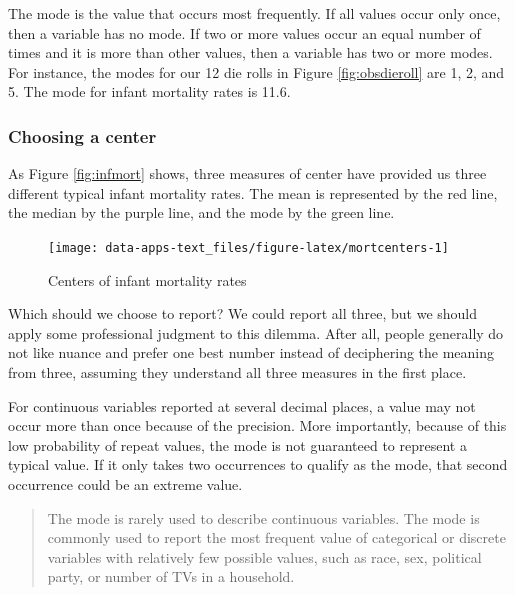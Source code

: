 \documentclass[
]{book}
\begin{document}
The mode is the value that occurs most frequently. If all values occur only once, then a variable has no mode. If two or more values occur an equal number of times and it is more than other values, then a variable has two or more modes. For instance, the modes for our 12 die rolls in Figure \ref{fig:obsdieroll} are 1, 2, and 5. The mode for infant mortality rates is 11.6.

\hypertarget{choosing-a-center}{%
\subsubsection*{Choosing a center}\label{choosing-a-center}}

As Figure \ref{fig:infmort} shows, three measures of center have provided us three different typical infant mortality rates. The mean is represented by the red line, the median by the purple line, and the mode by the green line.

\begin{figure}

{\centering \texttt{[image: data-apps-text\_files/figure-latex/mortcenters-1]} 

}

\caption{Centers of infant mortality rates}\label{fig:mortcenters}
\end{figure}

Which should we choose to report? We could report all three, but we should apply some professional judgment to this dilemma. After all, people generally do not like nuance and prefer one best number instead of deciphering the meaning from three, assuming they understand all three measures in the first place.

For continuous variables reported at several decimal places, a value may not occur more than once because of the precision. More importantly, because of this low probability of repeat values, the mode is not guaranteed to represent a typical value. If it only takes two occurrences to qualify as the mode, that second occurrence could be an extreme value.

\begin{quote}
The mode is rarely used to describe continuous variables. The mode is commonly used to report the most frequent value of categorical or discrete variables with relatively few possible values, such as race, sex, political party, or number of TVs in a household.
\end{quote}
\end{document}
